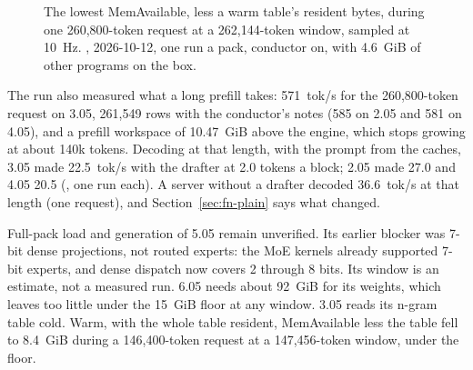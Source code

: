 \begin{figure}[htbp]
\centering
{}
\caption[The packs at a 262,144-token window]{The lowest MemAvailable, less a warm table's resident bytes, during one 260,800-token request at a 262,144-token window, sampled at 10~Hz. \measured, 2026-10-12, one run a pack, conductor on, with 4.6~GiB of other programs on the box.}\label{fig:fn-fit}
\end{figure}

The run also measured what a long prefill takes: 571~tok/s for the 260,800-token request on 3.05, 261,549 rows with the conductor's notes (585 on 2.05 and 581 on 4.05), and a prefill workspace of 10.47~GiB above the engine, which stops growing at about 140k tokens. Decoding at that length, with the prompt from the caches, 3.05 made 22.5~tok/s with the drafter at 2.0 tokens a block; 2.05 made 27.0 and 4.05 20.5 (\measured, one run each). A server without a drafter decoded 36.6~tok/s at that length (one request), and Section~\ref{sec:fn-plain} says what changed.

Full-pack load and generation of 5.05 remain unverified. Its earlier blocker was 7-bit dense projections, not routed experts: the MoE kernels already supported 7-bit experts, and dense dispatch now covers 2 through 8 bits. Its window is an estimate, not a measured run. 6.05 needs about 92~GiB for its weights, which leaves too little under the 15~GiB floor at any window. 3.05 reads its n-gram table cold. Warm, with the whole table resident, MemAvailable less the table fell to 8.4~GiB during a 146,400-token request at a 147,456-token window, under the floor.

